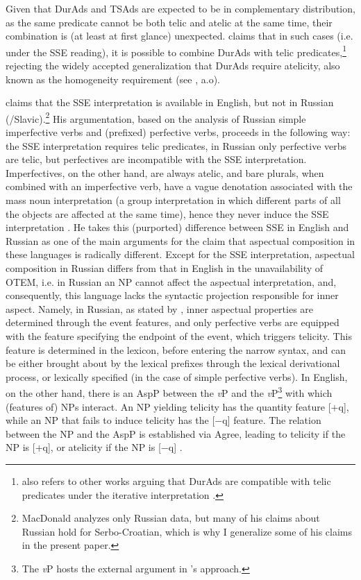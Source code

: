 \documentclass[output=paper,colorlinks,citecolor=brown]{langscibook}
\begin{document}
\noindent Given that DurAds and TSAds are expected to be in complementary distribution, as the same predicate cannot be both telic and atelic at the same time, their combination is (at least at first glance) unexpected. \citet[36]{MacDonald_2008} claims that in such cases (i.e. under the SSE reading), it is possible to combine DurAds with telic predicates,\footnote{\citet[33]{MacDonald_2008} also refers to other works arguing that DurAds are compatible with telic predicates under the iterative interpretation \citep{Alsina1999,Jackendoff1996, Schmitt1996, Tenny1987, VandenWyngaerd2001}.} rejecting the widely accepted generalization that DurAds require atelicity, also known as the homogeneity requirement (see \citealt{Borer_2005,Csirmaz_2009,LandmanRothstein2010,LandmanRothstein2012a,LandmanRothstein2012b}, a.o).

\citet{MacDonald_2008} claims that the SSE interpretation is available in English, but not in Russian (/Slavic).\footnote{MacDonald analyzes only Russian data, but many of his claims about Russian hold for Serbo-Croatian, which is why I generalize some of his claims in the present paper.} His argumentation, based on the analysis of Russian simple imperfective verbs and (prefixed) perfective verbs, proceeds in the following way: the SSE interpretation requires telic predicates, in Russian only perfective verbs are telic, but perfectives are incompatible with the SSE interpretation. Imperfectives, on the other hand, are always atelic, and bare plurals, when combined with an imperfective verb, have a vague denotation associated with the mass noun interpretation (a group interpretation in which different parts of all the objects are affected at the same time), hence they never induce the SSE interpretation \citep [147]{MacDonald_2008}. He takes this (purported) difference between SSE in English and Russian as one of the main arguments for the claim that aspectual composition in these languages is radically different. Except for the SSE interpretation, aspectual composition in Russian differs from that in English in the unavailability of OTEM, i.e. in Russian an NP cannot affect the aspectual interpretation, and, consequently, this language lacks the syntactic projection responsible for inner aspect. Namely, in Russian, as stated by \citeauthor{MacDonald_2008}, inner aspectual properties are determined through the event features, and only perfective verbs are equipped with the feature specifying the endpoint of the event, which triggers telicity. This feature is determined in the lexicon, before entering the narrow syntax, and can be either brought about by the lexical prefixes through the lexical derivational process, or lexically specified (in the case of simple perfective verbs). In English, on the other hand, there is an AspP between the \textit{v}P and the \textit{v}P\footnote{The \textit{v}P hosts the external argument in \citeauthor{MacDonald_2008}'s approach.} with which (features of) NPs interact. An NP yielding telicity has the quantity feature [$+$q], while an NP that fails to induce telicity has the [$-$q] feature. The relation between the NP and the AspP is established via Agree, leading to telicity if the NP is [$+$q], or atelicity if the NP is [$-$q] \citep{MacDonald_2008, MacDonald2010, MacDonald2012}.
\end{document}
